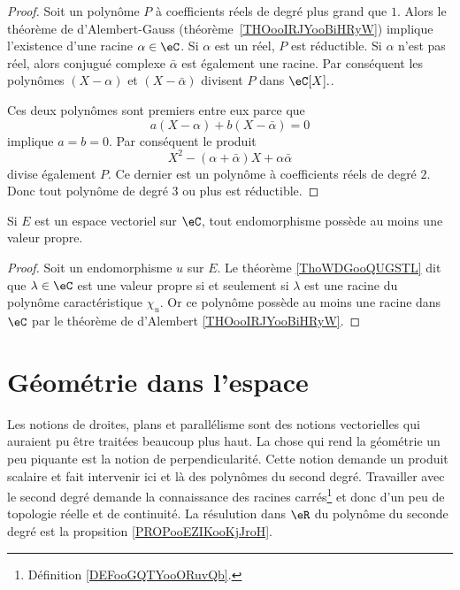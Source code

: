 \begin{proof}
    Soit un polynôme \( P\) à coefficients réels de degré plus grand que \( 1\). Alors le théorème de d'Alembert-Gauss (théorème~\ref{THOooIRJYooBiHRyW}) implique l'existence d'une racine \( \alpha \in \eC \). Si $\alpha$ est un réel, $P$ est réductible. Si \( \alpha\) n'est pas réel, alors conjugué complexe \( \bar \alpha\) est également une racine. Par conséquent les polynômes \( (X-\alpha)\) et \( (X-\bar \alpha)\) divisent \( P\) dans \( \eC[X]. \).

    Ces deux polynômes sont premiers entre eux parce que
    \begin{equation}
        a(X-\alpha)+b(X-\bar \alpha)=0
    \end{equation}
    implique \( a=b=0\). Par conséquent le produit
    \begin{equation}
        X^2-(\alpha+\bar \alpha)X+\alpha\bar\alpha
    \end{equation}
    divise également \( P\). Ce dernier est un polynôme à coefficients réels de degré \( 2\). Donc tout polynôme de degré \( 3\) ou plus est réductible.
\end{proof}

\begin{proposition}     \label{PROPooLXGSooXmVcVG}
    Si \( E\) est un espace vectoriel sur \( \eC\), tout endomorphisme possède au moins une valeur propre.
\end{proposition}

\begin{proof}
    Soit un endomorphisme \( u\) sur \( E\). Le théorème \ref{ThoWDGooQUGSTL} dit que \( \lambda\in \eC\) est une valeur propre si et seulement si \( \lambda\) est une racine du polynôme caractéristique \( \chi_u\). Or ce polynôme possède au moins une racine dans \( \eC\) par le théorème de d'Alembert \ref{THOooIRJYooBiHRyW}.
\end{proof}

\section{Géométrie dans l'espace}

\begin{normaltext}
    Les notions de droites, plans et parallélisme sont des notions vectorielles qui auraient pu être traitées beaucoup plus haut. La chose qui rend la géométrie un peu piquante est la notion de perpendicularité. Cette notion demande un produit scalaire et fait intervenir ici et là des polynômes du second degré. Travailler avec le second degré demande la connaissance des racines carrés\footnote{Définition \ref{DEFooGQTYooORuvQb}.} et donc d'un peu de topologie réelle et de continuité. La résulution dans \( \eR\) du polynôme du seconde degré est la propsition \ref{PROPooEZIKooKjJroH}.
\end{normaltext}

